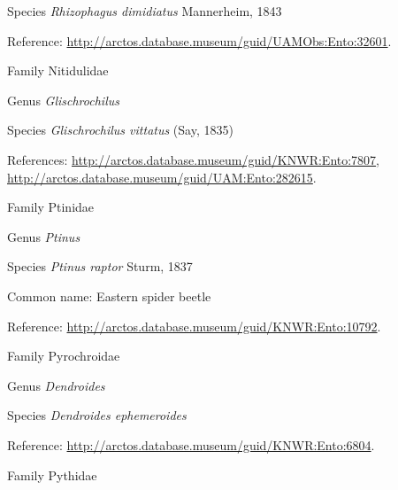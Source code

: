 \documentclass[9pt, article]{memoir}
\begin{document}
\begin{multicols}{2}
\vspace{6pt}\noindent\hspace{36pt}Species \textit{Rhizophagus dimidiatus} Mannerheim, 1843


Reference: 
\url{http://arctos.database.museum/guid/UAMObs:Ento:32601}.

\vspace{6pt}\noindent\hspace{24pt}Family Nitidulidae


\vspace{6pt}\noindent\hspace{30pt}Genus \textit{Glischrochilus}


\vspace{6pt}\noindent\hspace{36pt}Species \textit{Glischrochilus vittatus} (Say, 1835)


References: 
\url{http://arctos.database.museum/guid/KNWR:Ento:7807}, 
\url{http://arctos.database.museum/guid/UAM:Ento:282615}.

\vspace{6pt}\noindent\hspace{24pt}Family Ptinidae


\vspace{6pt}\noindent\hspace{30pt}Genus \textit{Ptinus}


\vspace{6pt}\noindent\hspace{36pt}Species \textit{Ptinus raptor} Sturm, 1837


Common name: Eastern spider beetle

Reference: 
\url{http://arctos.database.museum/guid/KNWR:Ento:10792}.

\vspace{6pt}\noindent\hspace{24pt}Family Pyrochroidae


\vspace{6pt}\noindent\hspace{30pt}Genus \textit{Dendroides}


\vspace{6pt}\noindent\hspace{36pt}Species \textit{Dendroides ephemeroides}


Reference: 
\url{http://arctos.database.museum/guid/KNWR:Ento:6804}.

\vspace{6pt}\noindent\hspace{24pt}Family Pythidae



\end{multicols}
\end{document}
